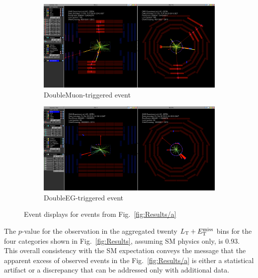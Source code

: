 \begin{figure}
\begin{center}
	\begin{subfigure}{\textwidth}
		\includegraphics[width=\textwidth]{Results/EventDisplay_DoubleMuon}
		\caption{DoubleMuon-triggered event \vspace{1em}}
	\end{subfigure}
	\begin{subfigure}{\textwidth}
		\includegraphics[width=\textwidth]{Results/EventDisplay_DoubleEG}
		\caption{DoubleEG-triggered event}
	\end{subfigure}
	\caption{Event displays for events from Fig.~\ref{fig:Results/a}
	\label{fig:Results/eventDisplays}}
\end{center}
\end{figure}

The $p$-value for the observation in the aggregated twenty $L_\textrm{T} + E_{\mathrm{T}}^{\text{miss}}$ bins for the four categories shown in Fig.~\ref{fig:Results}, assuming SM physics only, is 0.93. This overall consistency with the SM expectation conveys the message that the apparent excess of observed events in the Fig.~\ref{fig:Results/a} is either a statistical artifact or a discrepancy that can be addressed only with additional data.

